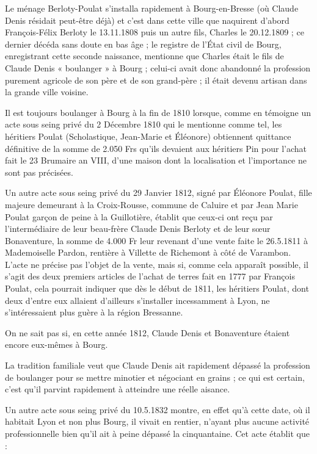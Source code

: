 \documentclass[11pt,a4paper]{report}
\begin{document}
Le ménage Berloty-Poulat s'installa rapidement à Bourg-en-Bresse (où Claude Denis résidait peut-être déjà) et c'est dans cette ville que naquirent d'abord François-Félix Berloty le 13.11.1808 puis un autre fils, Charles le 20.12.1809 ; ce dernier décéda sans doute en bas âge ; le registre de l'État civil de Bourg, enregistrant cette seconde naissance, mentionne que Charles était le fils de Claude Denis « boulanger » à Bourg ; celui-ci avait donc abandonné la profession purement agricole de son père et de son grand-père ; il était devenu artisan dans la grande ville voisine.

Il est toujours boulanger à Bourg à la fin de 1810 lorsque, comme en témoigne un acte sous seing privé du 2 Décembre 1810 qui le mentionne comme tel, les héritiers Poulat (Scholastique, Jean-Marie et Éléonore) obtiennent quittance définitive de la somme de 2.050 Frs qu'ils devaient aux héritiers Pin pour l'achat fait le 23 Brumaire an VIII, d'une maison dont la localisation et l'importance ne sont pas précisées.

Un autre acte sous seing privé du 29 Janvier 1812, signé par Éléonore Poulat, fille majeure demeurant à la Croix-Rousse, commune de Caluire et par Jean Marie Poulat garçon de peine à la Guillotière, établit que ceux-ci ont reçu par l'intermédiaire de leur beau-frère Claude Denis Berloty et de leur sœur Bonaventure, la somme de 4.000 Fr leur revenant d'une vente faite le 26.5.1811 à Mademoiselle Pardon, rentière à Villette de Richemont à côté de Varambon. L'acte ne précise pas l'objet de la vente, mais si, comme cela apparaît possible, il s'agit des deux premiers articles de l'achat de terres fait en 1777 par François Poulat, cela pourrait indiquer que dès le début de 1811, les héritiers Poulat, dont deux d'entre eux allaient d'ailleurs s'installer incessamment à Lyon, ne s'intéressaient plus guère à la région Bressanne.

On ne sait pas si, en cette année 1812, Claude Denis et Bonaventure étaient encore eux-mêmes à Bourg.


La tradition familiale veut que Claude Denis ait rapidement dépassé la profession de boulanger pour se mettre minotier et négociant en grains ; ce qui est certain, c'est qu'il parvint rapidement à atteindre une réelle aisance.

Un autre acte sous seing privé du 10.5.1832 montre, en effet qu'à cette date, où il habitait Lyon et non plus Bourg, il vivait en rentier, n'ayant plus aucune activité professionnelle bien qu'il ait à peine dépassé la cinquantaine. Cet acte établit que :
\end{document}
